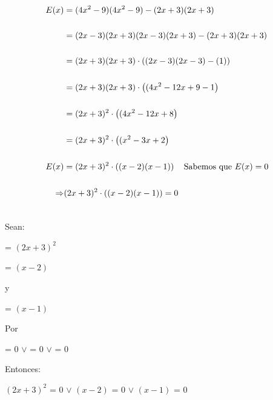 \documentclass[12pt]{article}
\begin{document}
\begin{equation*}
    \begin{split}
      E(x) & = (4x^{2} - 9)(4x^{2} - 9) - (2x+3)(2x+3)\\\\ 
      & = (2x-3)(2x+3)(2x-3)(2x+3) - (2x+3)(2x+3) \\\\
      & = (2x+3)(2x+3)\cdot\left((2x-3)(2x-3) - (1)\right) \\\\ 
      & = (2x+3)(2x+3)\cdot\left((4x^{2}-12x+9-1\right)\\\\
      & = (2x+3)^{2}\cdot\left((4x^{2}-12x+8\right)\\\\
      & = (2x+3)^{2}\cdot\left((x^{2}-3x+2\right) \\\\
E(x) & = (2x+3)^{2}\cdot\left((x-2)(x-1)\right) \quad \textup{Sabemos que $E(x)= 0$}\\\\
      \Rightarrow & (2x+3)^{2}\cdot\left((x-2)(x-1)\right) = 0 \\\\
    \end{split}
\end{equation*}

Sean: 
\begin{center}
   {} = $(2x+3)^{2}$   
\end{center}

\begin{center}
   {} = $(x-2)$   
\end{center}
    \begin{center}
    y
\end{center}

\begin{center}
    {} = $(x-1)$   
\end{center}
Por {}
\begin{center}
   {} = $0$  $\vee$ {} = $0$  $\vee$ {} = $0$ 
\end{center}

Entonces:

\begin{center}
   
   $(2x+3)^{2}$ = $0$  $\vee$ $(x-2)$ = $0$ $\vee$ $(x-1)$ = $0$
   
\end{center}
\end{document}

